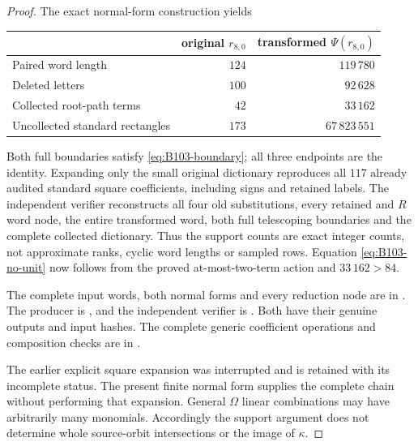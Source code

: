 \begin{proof}
The exact normal-form construction yields
\begin{center}
\begin{tabular}{lrr}
\toprule
 & original $r_{8,0}$ & transformed $\Psi(r_{8,0})$\\
\midrule
Paired word length & $124$ & $119\,780$\\
Deleted letters & $100$ & $92\,628$\\
Collected root-path terms & $42$ & $33\,162$\\
Uncollected standard rectangles & $173$ & $67\,823\,551$\\
\bottomrule
\end{tabular}
\end{center}
Both full boundaries satisfy \eqref{eq:B103-boundary}; all three
endpoints are the identity. Expanding only the small original
dictionary reproduces all $117$ already audited standard square
coefficients, including signs and retained labels.
The independent verifier reconstructs all four old substitutions,
every retained and $R$ word node, the entire transformed word,
both full telescoping boundaries and the complete collected
dictionary. Thus the support counts are exact integer counts,
not approximate ranks, cyclic word lengths or sampled rows.
Equation \eqref{eq:B103-no-unit} now follows from the proved
at-most-two-term action and $33\,162>84$.

\begingroup\raggedright
The complete input words, both normal forms and every reduction
node are in
.
The producer is ,
and the independent verifier is
.
Both have their genuine outputs and input hashes. The complete
generic coefficient operations and composition checks are in
.\par
\endgroup
The earlier explicit square expansion was interrupted and is
retained with its incomplete status. The present finite normal
form supplies the complete chain without performing that expansion.
General $\Omega$ linear combinations may have arbitrarily many
monomials. Accordingly the support argument does not determine
whole source-orbit intersections or the image of $\kappa$.
\end{proof}
